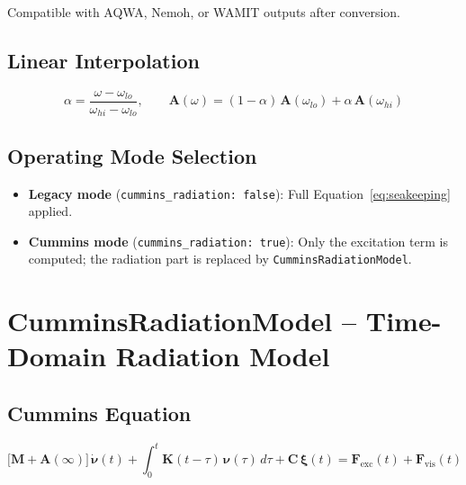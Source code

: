 \documentclass[12pt,a4paper]{article}
\newcommand{\nuvec}{\boldsymbol{\nu}}
\newcommand{\nudot}{\dot{\boldsymbol{\nu}}}
\newcommand{\xivec}{\boldsymbol{\xi}}
\newcommand{\Fvec}{\mathbf{F}}
\newcommand{\Kvec}{\mathbf{K}}
\newcommand{\Cvec}{\mathbf{C}}
\newcommand{\Avec}{\mathbf{A}}
\newcommand{\Ainf}{\mathbf{A}(\infty)}
\begin{document}
Compatible with AQWA, Nemoh, or WAMIT outputs after conversion.

\subsection{Linear Interpolation}

\begin{equation}
  \alpha = \frac{\omega - \omega_{lo}}{\omega_{hi} - \omega_{lo}},
  \qquad
  \Avec(\omega) = (1-\alpha)\,\Avec(\omega_{lo}) + \alpha\,\Avec(\omega_{hi})
  \label{eq:interp}
\end{equation}

\subsection{Operating Mode Selection}

\begin{itemize}
  \item \textbf{Legacy mode} (\texttt{cummins\_radiation: false}):
        Full Equation~\eqref{eq:seakeeping} applied.
  \item \textbf{Cummins mode} (\texttt{cummins\_radiation: true}):
        Only the excitation term is computed; the radiation part
        is replaced by \texttt{CumminsRadiationModel}.
\end{itemize}

\section{CumminsRadiationModel -- Time-Domain Radiation Model}

\subsection{Cummins Equation}

\begin{equation}
  \boxed{
  \bigl[\mathbf{M} + \Ainf\bigr]\,\nudot(t)
  + \int_0^t \Kvec(t-\tau)\,\nuvec(\tau)\,d\tau
  + \Cvec\,\xivec(t)
  = \Fvec_{\text{exc}}(t) + \Fvec_{\text{vis}}(t)
  }
  \label{eq:cummins}
\end{equation}
\end{document}
